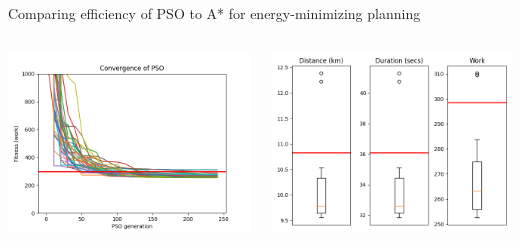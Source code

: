 \documentclass[9pt,xcolor=table]{beamer}
\begin{document}
\begin{frame}{Comparing efficiency of PSO to A* for energy-minimizing planning}
\begin{columns}
        \begin{column}{0.5\textwidth}
            \includegraphics[width=\textwidth,trim={0cm 0cm 0cm 0cm},clip]{img/FP2_convergence.png}
        \end{column}
        \begin{column}{0.5\textwidth}
            \includegraphics[width=\textwidth,trim={0cm 0cm 0cm 0cm},clip]{img/FP2_box.png}
        \end{column}
    \end{columns}
\end{frame}
\end{document}

